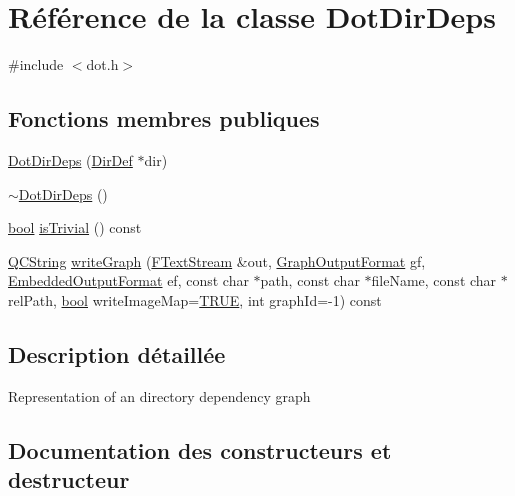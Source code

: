 \hypertarget{class_dot_dir_deps}{}\section{Référence de la classe Dot\+Dir\+Deps}
\label{class_dot_dir_deps}


{\ttfamily \#include $<$dot.\+h$>$}

\subsection*{Fonctions membres publiques}
\begin{DoxyCompactItemize}
\item 
\hyperlink{class_dot_dir_deps_a265d81baaeb7a83e2203dd55785fd10e}{Dot\+Dir\+Deps} (\hyperlink{class_dir_def}{Dir\+Def} $\ast$dir)
\item 
\hyperlink{class_dot_dir_deps_abf8e83e88014ce0fa7fb71891a57c9f9}{$\sim$\+Dot\+Dir\+Deps} ()
\item 
\hyperlink{qglobal_8h_a1062901a7428fdd9c7f180f5e01ea056}{bool} \hyperlink{class_dot_dir_deps_ad1924dfd45d106a832262b9826c1698d}{is\+Trivial} () const 
\item 
\hyperlink{class_q_c_string}{Q\+C\+String} \hyperlink{class_dot_dir_deps_ab5e895479ed44f1d06685232c48c5a6a}{write\+Graph} (\hyperlink{class_f_text_stream}{F\+Text\+Stream} \&out, \hyperlink{dot_8h_ac60ef98d62b78366a17c9f1bda96523f}{Graph\+Output\+Format} gf, \hyperlink{dot_8h_a8680135da08a5ef57cebe20060912dcc}{Embedded\+Output\+Format} ef, const char $\ast$path, const char $\ast$file\+Name, const char $\ast$rel\+Path, \hyperlink{qglobal_8h_a1062901a7428fdd9c7f180f5e01ea056}{bool} write\+Image\+Map=\hyperlink{qglobal_8h_a04a6422a52070f0dc478693da640242b}{T\+R\+U\+E}, int graph\+Id=-\/1) const 
\end{DoxyCompactItemize}


\subsection{Description détaillée}
Representation of an directory dependency graph 

\subsection{Documentation des constructeurs et destructeur}
\hypertarget{class_dot_dir_deps_a265d81baaeb7a83e2203dd55785fd10e}{}
